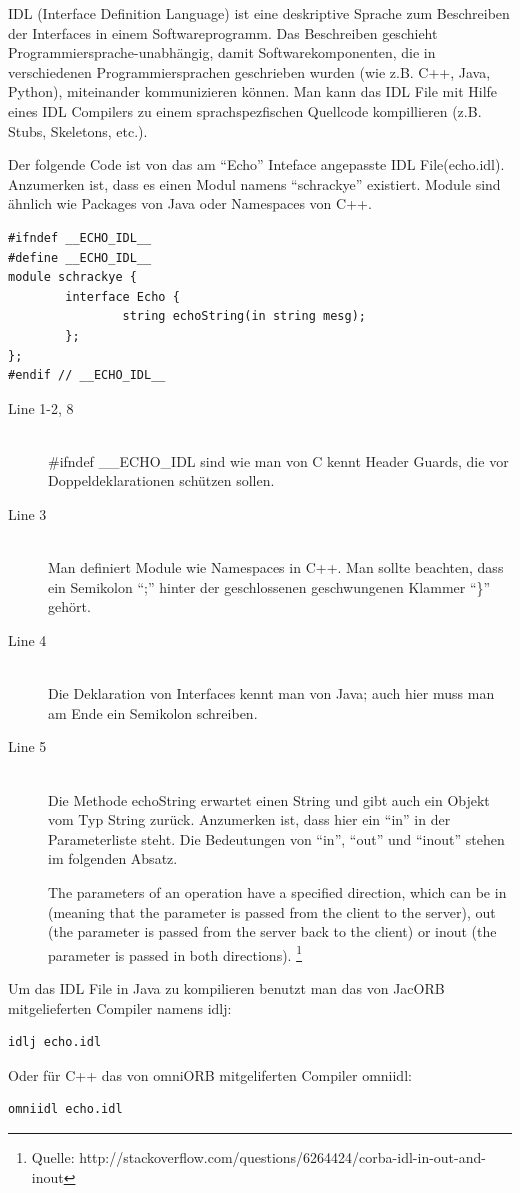 \documentclass[11pt]{article}
\begin{document}
IDL (Interface Definition Language) ist eine deskriptive Sprache zum Beschreiben der Interfaces in einem Softwareprogramm. Das Beschreiben geschieht Programmiersprache-unabhängig, damit Softwarekomponenten, die in verschiedenen Programmiersprachen geschrieben wurden (wie z.B. C++, Java, Python), miteinander kommunizieren können. Man kann das IDL File mit Hilfe eines IDL Compilers zu einem sprachspezfischen Quellcode kompillieren (z.B. Stubs, Skeletons, etc.). 

Der folgende Code ist von das am ``Echo'' Inteface angepasste IDL File(echo.idl). Anzumerken ist, dass es einen Modul namens ``schrackye'' existiert. Module sind ähnlich wie Packages von Java oder Namespaces von C++. 

\lstset{language=IDL}  

\begin{lstlisting}
#ifndef __ECHO_IDL__
#define __ECHO_IDL__
module schrackye {
        interface Echo {
                string echoString(in string mesg);
        };
};
#endif // __ECHO_IDL__         

\end{lstlisting}

\begin{description}
\item[Line 1-2, 8] \hfill \\
\#ifndef \_\_ECHO\_IDL sind wie man von C kennt Header Guards, die vor Doppeldeklarationen schützen sollen. 
\item[Line 3] \hfill \\
Man definiert Module wie Namespaces in C++. Man sollte beachten, dass ein Semikolon ``;'' hinter der geschlossenen geschwungenen Klammer ``\}'' gehört.
\item[Line 4] \hfill \\
Die Deklaration von Interfaces kennt man von Java; auch hier muss man am Ende ein Semikolon schreiben.
\item[Line 5] \hfill \\
Die Methode echoString erwartet einen String und gibt auch ein Objekt vom Typ String zurück. Anzumerken ist, dass hier ein ``in'' in der Parameterliste steht. Die Bedeutungen von ``in'', ``out'' und ``inout'' stehen im folgenden Absatz.

The parameters of an operation have a specified direction, which can be in (meaning that the parameter is passed from the client to the server), out (the parameter is passed from the server back to the client) or inout (the parameter is passed in both directions). \footnote{Quelle: http://stackoverflow.com/questions/6264424/corba-idl-in-out-and-inout}
\end{description}
Um das IDL File in Java zu kompilieren benutzt man das von JacORB mitgelieferten Compiler namens idlj:
\lstset{language=bash}
\begin{lstlisting}
idlj echo.idl
\end{lstlisting}
Oder für C++ das von omniORB mitgeliferten Compiler omniidl:
\begin{lstlisting}
omniidl echo.idl
\end{lstlisting}
\end{document}
